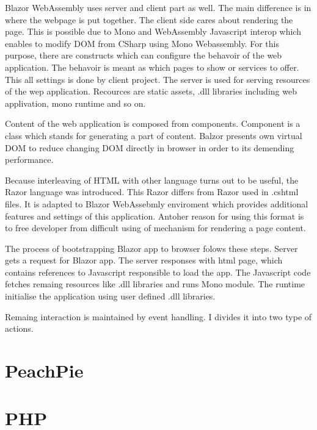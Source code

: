 Blazor WebAssembly uses server and client part as well.
The main difference is in where the webpage is put together.
The client side cares about rendering the page.
This is possible due to Mono and WebAssembly Javascript interop which enables to modify DOM from CSharp using Mono Webassembly.
For this purpose, there are constructs which can configure the behavoir of the web application.
The behavoir is meant as which pages to show or services to offer.
This all settings is done by client project.
The server is used for serving resources of the wep application.
Recources are static assets, .dll libraries including web applivation, mono runtime and so on.

Content of the web application is composed from components.
Component is a class which stands for generating a part of content.
Balzor presents own virtual DOM to reduce changing DOM directly in browser in order to its demending performance.


Because interleaving of HTML with other language turns out to be useful, the Razor language was introduced.
This Razor differs from Razor used in .cshtml files.
It is adapted to Blazor WebAssebmly enviroment which provides additional features and settings of this application.
Antoher reason for using this format is to free developer from difficult using of mechanism for rendering a page content.

The process of bootstrapping Blazor app to browser folows these steps. 
Server gets a request for Blazor app. 
The server responses with html page, which contains references to Javascript responsible to load the app. The Javascript code fetches remaing resources like .dll libraries and runs Mono module. 
The runtime initialise the application using user defined .dll libraries.

Remaing interaction is maintained by event handling.
I divides it into two type of actions.

\section{PeachPie}


\section{PHP}

